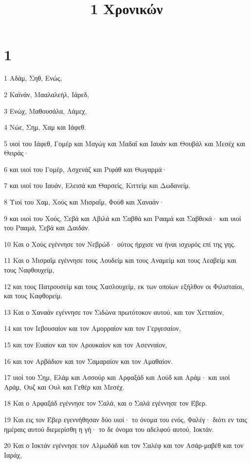 

\title{1 Χρονικών}


\chapter{1}

\par 1 Αδάμ, Σηθ, Ενώς,
\par 2 Καϊνάν, Μααλαλεήλ, Ιάρεδ,
\par 3 Ενώχ, Μαθουσάλα, Λάμεχ,
\par 4 Νώε, Σημ, Χαμ και Ιάφεθ.
\par 5 υιοί του Ιάφεθ, Γομέρ και Μαγώγ και Μαδαΐ και Ιαυάν και Θουβάλ και Μεσέχ και Θειράς·
\par 6 και υιοί του Γομέρ, Ασχενάζ και Ριφάθ και Θωγαρμά·
\par 7 και υιοί του Ιαυάν, Ελεισά και Θαρσείς, Κιττείμ και Δωδανείμ.
\par 8 Υιοί του Χαμ, Χούς και Μισραΐμ, Φούθ και Χαναάν·
\par 9 και υιοί του Χούς, Σεβά και Αβιλά και Σαβθά και Ρααμά και Σαβθεκά· και υιοί του Ρααμά, Σεβά και Δαιδάν.
\par 10 Και ο Χούς εγέννησε τον Νεβρώδ· ούτος ήρχισε να ήναι ισχυρός επί της γης.
\par 11 Και ο Μισραΐμ εγέννησε τους Λουδείμ και τους Αναμείμ και τους Λεαβείμ και τους Ναφθουχείμ,
\par 12 και τους Πατρουσείμ και τους Χασλουχείμ, εκ των οποίων εξήλθον οι Φιλισταίοι, και τους Καφθορείμ.
\par 13 Και ο Χαναάν εγέννησε τον Σιδώνα πρωτότοκον αυτού, και τον Χετταίον,
\par 14 και τον Ιεβουσαίον και τον Αμορραίον και τον Γεργεσαίον,
\par 15 και τον Ευαίον και τον Αρουκαίον και τον Ασενναίον,
\par 16 και τον Αρβάδιον και τον Σαμαραίον και τον Αμαθαίον.
\par 17 υιοί του Σημ, Ελάμ και Ασσούρ και Αρφαξάδ και Λούδ και Αράμ· και υιοί Αράμ, Ουζ και Ουλ και Γεθέρ και Μεσέχ.
\par 18 Και ο Αρφαξάδ εγέννησε τον Σαλά, και ο Σαλά εγέννησε τον Έβερ.
\par 19 Και εις τον Έβερ εγεννήθησαν δύο υιοί· το όνομα του ενός, Φαλέγ· διότι εν ταις ημέραις αυτού διεμερίσθη η γή· το δε όνομα του αδελφού αυτού, Ιοκτάν.
\par 20 Και ο Ιοκτάν εγέννησε τον Αλμωδάδ και τον Σαλέφ και τον Ασάρ-μαβέθ και τον Ιαράχ,
